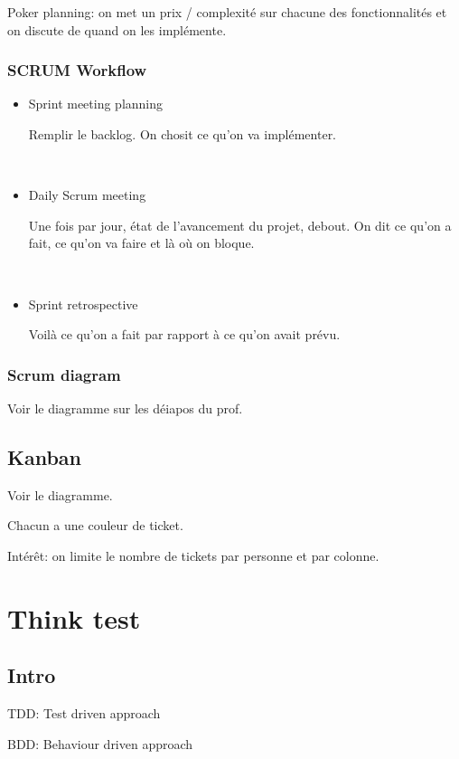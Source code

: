 \documentclass[a4paper,11pt]{article}
\begin{document}
Poker planning: on met un prix / complexité sur chacune des fonctionnalités et
on discute de quand on les implémente.

\subsubsection{SCRUM Workflow}

\begin{itemize}
\item Sprint meeting planning

  Remplir le backlog. On chosit ce qu'on va implémenter.

  \

\item Daily Scrum meeting

  Une fois par jour, état de l'avancement du projet, debout.
  On dit ce qu'on a fait, ce qu'on va faire et là où on bloque.

  \

\item Sprint retrospective

  Voilà ce qu'on a fait par rapport à ce qu'on avait prévu.
\end{itemize}

\subsubsection{Scrum diagram}

Voir le diagramme sur les déiapos du prof.

\subsection{Kanban}

Voir le diagramme.

Chacun a une couleur de ticket.

Intérêt: on limite le nombre de tickets par personne et par colonne.

\section{Think test}

\subsection{Intro}

TDD: Test driven approach

BDD: Behaviour driven approach
\end{document}
